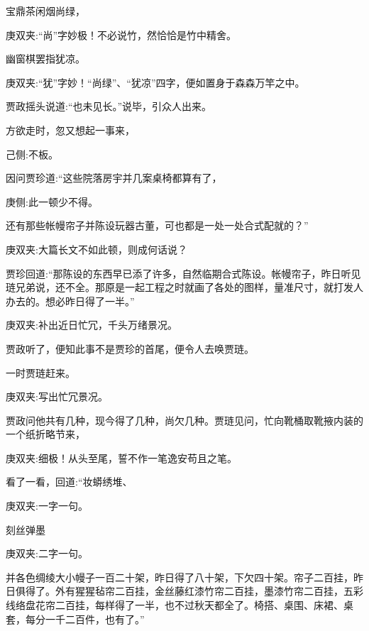 \begin{poem}
    \begin{pl}宝鼎茶闲烟尚绿，\end{pl}
    \begin{note}庚双夹:“尚”字妙极！不必说竹，然恰恰是竹中精舍。\end{note}

    \begin{pl}幽窗棋罢指犹凉。\end{pl}
    \begin{note}庚双夹:“犹”字妙！“尚绿”、“犹凉”四字，便如置身于森森万竿之中。\end{note}
\end{poem}


\begin{parag}
    贾政摇头说道:“也未见长。”说毕，引众人出来。
\end{parag}


\begin{parag}
    方欲走时，忽又想起一事来，\begin{note}己侧:不板。\end{note}因问贾珍道:“这些院落房宇并几案桌椅都算有了，\begin{note}庚侧:此一顿少不得。\end{note}还有那些帐幔帘子并陈设玩器古董，可也都是一处一处合式配就的？”\begin{note}庚双夹:大篇长文不如此顿，则成何话说？\end{note}贾珍回道:“那陈设的东西早已添了许多，自然临期合式陈设。帐幔帘子，昨日听见琏兄弟说，还不全。那原是一起工程之时就画了各处的图样，量准尺寸，就打发人办去的。想必昨日得了一半。”\begin{note}庚双夹:补出近日忙冗，千头万绪景况。\end{note}贾政听了，便知此事不是贾珍的首尾，便令人去唤贾琏。
\end{parag}


\begin{parag}
    一时贾琏赶来。\begin{note}庚双夹:写出忙冗景况。\end{note}贾政问他共有几种，现今得了几种，尚欠几种。贾琏见问，忙向靴桶取靴掖内装的一个纸折略节来，\begin{note}庚双夹:细极！从头至尾，誓不作一笔逸安苟且之笔。\end{note}看了一看，回道:“妆蟒绣堆、\begin{note}庚双夹:一字一句。\end{note}刻丝弹墨\begin{note}庚双夹:二字一句。\end{note}并各色绸绫大小幔子一百二十架，昨日得了八十架，下欠四十架。帘子二百挂，昨日俱得了。外有猩猩毡帘二百挂，金丝藤红漆竹帘二百挂，墨漆竹帘二百挂，五彩线络盘花帘二百挂，每样得了一半，也不过秋天都全了。椅搭、桌围、床裙、桌套，每分一千二百件，也有了。”
\end{parag}



